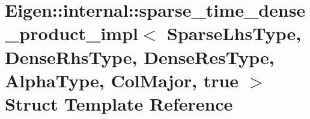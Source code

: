 \hypertarget{struct_eigen_1_1internal_1_1sparse__time__dense__product__impl_3_01_sparse_lhs_type_00_01_dense_4902bcccfe44923f57955b34ebedf211}{}\section{Eigen\+:\+:internal\+:\+:sparse\+\_\+time\+\_\+dense\+\_\+product\+\_\+impl$<$ Sparse\+Lhs\+Type, Dense\+Rhs\+Type, Dense\+Res\+Type, Alpha\+Type, Col\+Major, true $>$ Struct Template Reference}
\label{struct_eigen_1_1internal_1_1sparse__time__dense__product__impl_3_01_sparse_lhs_type_00_01_dense_4902bcccfe44923f57955b34ebedf211}
